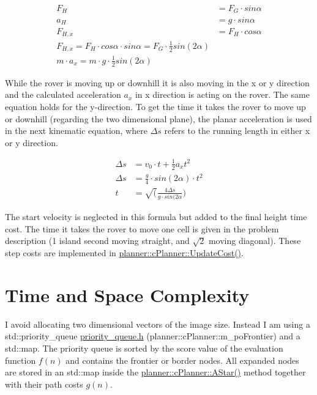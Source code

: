\begin{eqnarray*} F_H &= F_G \cdot sin\alpha \\ a_H &= g \cdot sin\alpha \\ F_{H,x} &= F_H \cdot cos\alpha \\ F_{H,x} = F_H \cdot cos\alpha \cdot sin\alpha = F_G \cdot \frac{1}{2} sin(2\alpha) \\ m \cdot a_x = m \cdot g \cdot \frac{1}{2} sin(2\alpha) \end{eqnarray*}

While the rover is moving up or downhill it is also moving in the x or y direction and the calculated acceleration $a_x$ in x direction is acting on the rover. The same equation holds for the y-\/direction. To get the time it takes the rover to move up or downhill (regarding the two dimensional plane), the planar acceleration is used in the next kinematic equation, where $\Delta s$ refers to the running length in either x or y direction.

\begin{eqnarray*} \Delta s &= v_0 \cdot t + \frac{1}{2} a_x t^2 \\ \Delta s &= \frac{g}{4} \cdot sin(2\alpha) \cdot t^2 \\ t &= \sqrt(\frac{4 \Delta s}{g \cdot sin(2\alpha}) \end{eqnarray*}

The start velocity is neglected in this formula but added to the final height time cost. The time it takes the rover to move one cell is given in the problem description (1 island second moving straight, and $\sqrt 2$ moving diagonal). These step costs are implemented in \mbox{\hyperlink{classplanner_1_1c_planner_a16e8c156297fff49a6ba9b97073baffb}{planner\+::c\+Planner\+::\+Update\+Cost()}}.

\section*{Time and Space Complexity}

I avoid allocating two dimensional vectors of the image size. Instead I am using a std\+::priority\+\_\+queue \mbox{\hyperlink{priority__queue_8h_source}{priority\+\_\+queue.\+h}} (planner\+::c\+Planner\+::m\+\_\+po\+Frontier) and a std\+::map. The priority queue is sorted by the score value of the evaluation function $f(n)$ and contains the frontier or border nodes. All expanded nodes are stored in an std\+::map inside the \mbox{\hyperlink{classplanner_1_1c_planner_a341e70531266f023ac9461d18979d1ef}{planner\+::c\+Planner\+::\+A\+Star()}} method together with their path costs $g(n)$.

